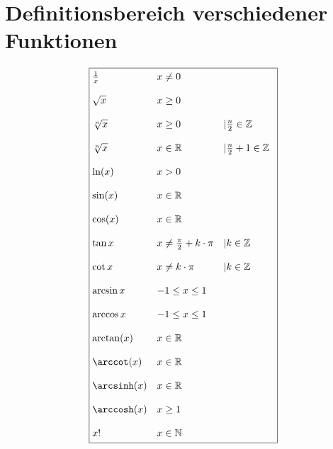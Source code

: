 



\section{Definitionsbereich verschiedener Funktionen}
\[ \boxed{\begin{array}{@{}lll}
\frac{1}{x} & x \neq 0 \\\\
\sqrt{x}    & x \geq 0 \\\\
\sqrt[n]{x} & x \geq 0 & \vert \frac{n}{2} \in \mathbb{Z} \\\\
\sqrt[n]{x} & x \in \mathbb{R} & \vert \frac{n}{2} + 1 \in \mathbb{Z} \\\\
\ln(x)      & x > 0 \\\\
\sin(x)     & x \in \mathbb{R} \\\\
\cos(x)     & x \in \mathbb{R} \\\\
\tan{x}     & x \neq \frac{\pi}{2} + k \cdot \pi & \vert k \in \mathbb{Z} \\\\
\cot{x}     & x \neq k \cdot \pi & \vert k \in \mathbb{Z} \\\\
\arcsin{x}  & -1 \leq x \leq 1 \\\\
\arccos{x}  & -1 \leq x \leq 1 \\\\
\arctan(x)  & x \in \mathbb{R} \\\\
\arccot(x)  & x \in \mathbb{R} \\\\
\arcsinh(x) & x \in \mathbb{R} \\\\
\arccosh(x) & x \geq 1 \\\\
x!          & x \in \mathbb{N}
\end{array}} \]
